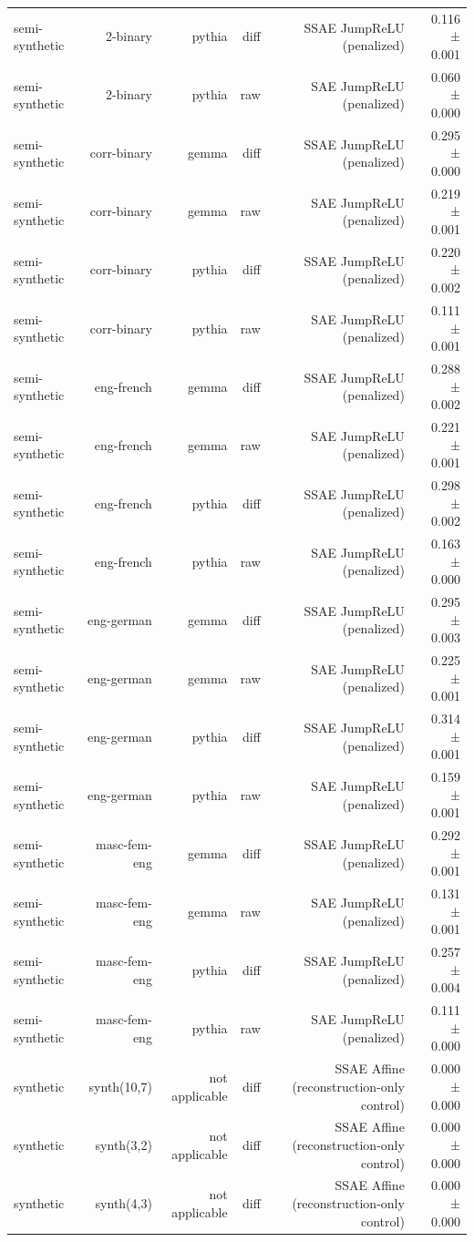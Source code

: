 \begin{table}[t]
\begin{tabular}{lrrrrr}
semi-synthetic & 2-binary & pythia & diff & SSAE JumpReLU (penalized) & 0.116 ± 0.001 \\
semi-synthetic & 2-binary & pythia & raw & SAE JumpReLU (penalized) & 0.060 ± 0.000 \\
semi-synthetic & corr-binary & gemma & diff & SSAE JumpReLU (penalized) & 0.295 ± 0.000 \\
semi-synthetic & corr-binary & gemma & raw & SAE JumpReLU (penalized) & 0.219 ± 0.001 \\
semi-synthetic & corr-binary & pythia & diff & SSAE JumpReLU (penalized) & 0.220 ± 0.002 \\
semi-synthetic & corr-binary & pythia & raw & SAE JumpReLU (penalized) & 0.111 ± 0.001 \\
semi-synthetic & eng-french & gemma & diff & SSAE JumpReLU (penalized) & 0.288 ± 0.002 \\
semi-synthetic & eng-french & gemma & raw & SAE JumpReLU (penalized) & 0.221 ± 0.001 \\
semi-synthetic & eng-french & pythia & diff & SSAE JumpReLU (penalized) & 0.298 ± 0.002 \\
semi-synthetic & eng-french & pythia & raw & SAE JumpReLU (penalized) & 0.163 ± 0.000 \\
semi-synthetic & eng-german & gemma & diff & SSAE JumpReLU (penalized) & 0.295 ± 0.003 \\
semi-synthetic & eng-german & gemma & raw & SAE JumpReLU (penalized) & 0.225 ± 0.001 \\
semi-synthetic & eng-german & pythia & diff & SSAE JumpReLU (penalized) & 0.314 ± 0.001 \\
semi-synthetic & eng-german & pythia & raw & SAE JumpReLU (penalized) & 0.159 ± 0.001 \\
semi-synthetic & masc-fem-eng & gemma & diff & SSAE JumpReLU (penalized) & 0.292 ± 0.001 \\
semi-synthetic & masc-fem-eng & gemma & raw & SAE JumpReLU (penalized) & 0.131 ± 0.001 \\
semi-synthetic & masc-fem-eng & pythia & diff & SSAE JumpReLU (penalized) & 0.257 ± 0.004 \\
semi-synthetic & masc-fem-eng & pythia & raw & SAE JumpReLU (penalized) & 0.111 ± 0.000 \\
synthetic & synth(10,7) & not applicable & diff & SSAE Affine (reconstruction-only control) & 0.000 ± 0.000 \\
synthetic & synth(3,2) & not applicable & diff & SSAE Affine (reconstruction-only control) & 0.000 ± 0.000 \\
synthetic & synth(4,3) & not applicable & diff & SSAE Affine (reconstruction-only control) & 0.000 ± 0.000 \\
\bottomrule
\end{tabular}
\end{table}
